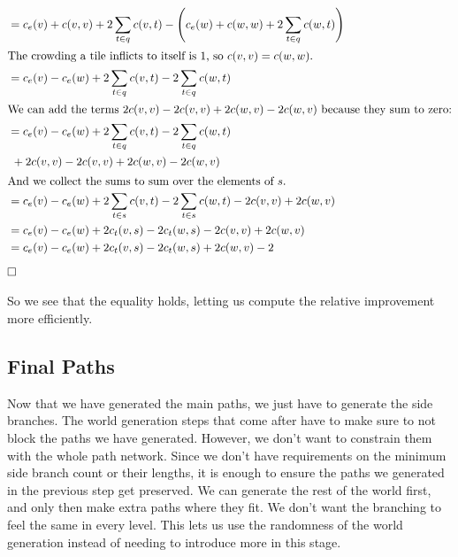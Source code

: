 \begin{align*}
     & = c_e(v) + c(v,v) + 2 \sum_{t \in q} c(v,t) - \left(c_e(w) + c(w,w) + 2 \sum_{t \in q} c(w,t) \right)                                                  \\
    \intertext{The crowding a tile inflicts to itself is 1, so $c(v,v) = c(w,w)$.}
     & = c_e(v) - c_e(w)  + 2 \sum_{t \in q} c(v,t) - 2 \sum_{t \in q} c(w,t)                                                                                 \\
    \intertext{We can add the terms $2c(v,v) - 2c(v,v) + 2c(w,v) - 2c(w,v)$ because they sum to zero:}
     & = c_e(v) - c_e(w)  + 2 \sum_{t \in q} c(v,t) - 2 \sum_{t \in q} c(w,t)                                                                                 \\
     & \ + 2c(v,v) - 2c(v,v) + 2c(w,v) - 2c(w,v)                                                                                                              \\
    \intertext{And we collect the sums to sum over the elements of $s$.}
     & = c_e(v) - c_e(w)  + 2 \sum_{t \in s} c(v,t) - 2 \sum_{t \in s} c(w,t) - 2c(v,v) + 2c(w,v)                                                             \\
     & = c_e(v) - c_e(w)  + 2 c_t(v,s) - 2 c_t(w,s) - 2c(v,v) + 2c(w,v)                                                                                       \\
     & = c_e(v) - c_e(w)  + 2 c_t(v,s) - 2 c_t(w,s) + 2c(w,v) - 2
\end{align*}
$\hfill\square$

So we see that the equality holds, letting us compute the relative improvement more efficiently.

\subsection{Final Paths}\label{sec:analysis-final-paths}

Now that we have generated the main paths, we just have to generate the side branches.
The world generation steps that come after have to make sure to not block the paths we have generated.
However, we don't want to constrain them with the whole path network.
Since we don't have requirements on the minimum side branch count or their lengths, it is enough to ensure the paths we generated in the previous step get preserved.
We can generate the rest of the world first, and only then make extra paths where they fit.
We don't want the branching to feel the same in every level.
This lets us use the randomness of the world generation instead of needing to introduce more in this stage.


